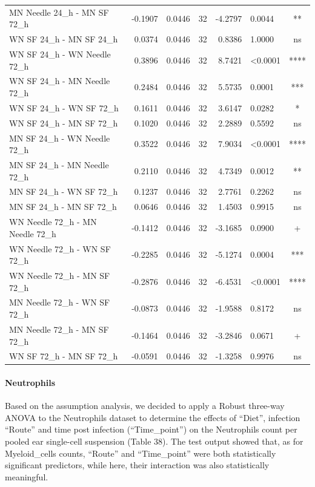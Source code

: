 \documentclass[
  12pt,
  letterpaper,
]{article}
\begin{document}
\begin{longtable}{l|rrrrlc}
MN Needle 24\_h - MN SF 72\_h & -0.1907 & 0.0446 & 32 & -4.2797 & 0.0044 & ** \\ 
WN SF 24\_h - MN SF 24\_h & 0.0374 & 0.0446 & 32 & 0.8386 & 1.0000 & ns \\ 
WN SF 24\_h - WN Needle 72\_h & 0.3896 & 0.0446 & 32 & 8.7421 & <0.0001 & **** \\ 
WN SF 24\_h - MN Needle 72\_h & 0.2484 & 0.0446 & 32 & 5.5735 & 0.0001 & *** \\ 
WN SF 24\_h - WN SF 72\_h & 0.1611 & 0.0446 & 32 & 3.6147 & 0.0282 & * \\ 
WN SF 24\_h - MN SF 72\_h & 0.1020 & 0.0446 & 32 & 2.2889 & 0.5592 & ns \\ 
MN SF 24\_h - WN Needle 72\_h & 0.3522 & 0.0446 & 32 & 7.9034 & <0.0001 & **** \\ 
MN SF 24\_h - MN Needle 72\_h & 0.2110 & 0.0446 & 32 & 4.7349 & 0.0012 & ** \\ 
MN SF 24\_h - WN SF 72\_h & 0.1237 & 0.0446 & 32 & 2.7761 & 0.2262 & ns \\ 
MN SF 24\_h - MN SF 72\_h & 0.0646 & 0.0446 & 32 & 1.4503 & 0.9915 & ns \\ 
WN Needle 72\_h - MN Needle 72\_h & -0.1412 & 0.0446 & 32 & -3.1685 & 0.0900 & + \\ 
WN Needle 72\_h - WN SF 72\_h & -0.2285 & 0.0446 & 32 & -5.1274 & 0.0004 & *** \\ 
WN Needle 72\_h - MN SF 72\_h & -0.2876 & 0.0446 & 32 & -6.4531 & <0.0001 & **** \\ 
MN Needle 72\_h - WN SF 72\_h & -0.0873 & 0.0446 & 32 & -1.9588 & 0.8172 & ns \\ 
MN Needle 72\_h - MN SF 72\_h & -0.1464 & 0.0446 & 32 & -3.2846 & 0.0671 & + \\ 
WN SF 72\_h - MN SF 72\_h & -0.0591 & 0.0446 & 32 & -1.3258 & 0.9976 & ns \\ 
\bottomrule
\end{longtable}

\paragraph{Neutrophils}\label{neutrophils-3}

Based on the assumption analysis, we decided to apply a Robust three-way ANOVA to the Neutrophils dataset to determine the effects of ``Diet'', infection ``Route'' and time post infection (``Time\_point'') on the Neutrophils count per pooled ear single-cell suspension (Table 38). The test output showed that, as for Myeloid\_cells counts, ``Route'' and ``Time\_point'' were both statistically significant predictors, while here, their interaction was also statistically meaningful.
\end{document}
